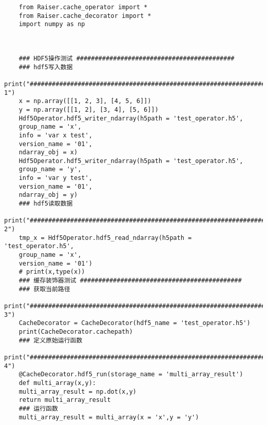 \documentclass[cn,hazy,blue,14pt,screen]{elegantnote}
\begin{document}
\begin{lstlisting}
	from Raiser.cache_operator import *
	from Raiser.cache_decorator import *
	import numpy as np 
	
	
	
	### HDF5操作测试 ###########################################
	### hdf5写入数据
	print("########################################################################## 1")
	x = np.array([[1, 2, 3], [4, 5, 6]])
	y = np.array([[1, 2], [3, 4], [5, 6]])
	Hdf5Operator.hdf5_writer_ndarray(h5path = 'test_operator.h5',
	group_name = 'x',
	info = 'var x test',
	version_name = '01',
	ndarray_obj = x)
	Hdf5Operator.hdf5_writer_ndarray(h5path = 'test_operator.h5',
	group_name = 'y',
	info = 'var y test',
	version_name = '01',
	ndarray_obj = y)                                 
	### hdf5读取数据
	print("########################################################################## 2")
	tmp_x = Hdf5Operator.hdf5_read_ndarray(h5path = 'test_operator.h5',
	group_name = 'x',
	version_name = '01')         
	# print(x,type(x))    
	### 缓存装饰器测试 ############################################
	### 获取当前路径
	print("########################################################################## 3")
	CacheDecorator = CacheDecorator(hdf5_name = 'test_operator.h5')
	print(CacheDecorator.cachepath)
	### 定义原始运行函数
	print("########################################################################## 4")
	@CacheDecorator.hdf5_run(storage_name = 'multi_array_result')
	def multi_array(x,y):
	multi_array_result = np.dot(x,y)
	return multi_array_result                                                           
	### 运行函数
	multi_array_result = multi_array(x = 'x',y = 'y')
\end{lstlisting}
\end{document}

